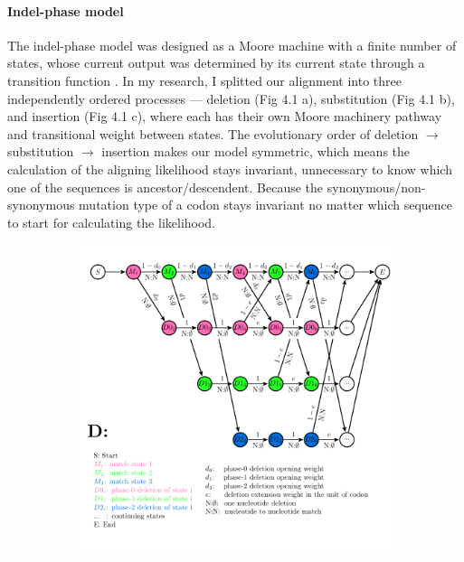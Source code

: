 \paragraph{Indel-phase model} The indel-phase model was designed as a Moore machine with a finite number of states, whose current output was determined by its current state through a transition function \parencite{giantamidis2021learning}. In my research, I splitted our alignment into three independently ordered processes --- deletion (Fig 4.1 a), substitution (Fig 4.1 b), and insertion (Fig 4.1 c), where each has their own Moore machinery pathway and transitional weight between states. The evolutionary order of  deletion $\rightarrow$ substitution $\rightarrow$ insertion makes our model symmetric, which means the calculation of the aligning likelihood stays invariant, unnecessary to know which one of the sequences is ancestor/descendent. Because the synonymous/non-synonymous mutation type of a codon stays invariant no matter which sequence to start for calculating the likelihood. 
\newpage
\begin{figure}[H]
    \centering
     \begin{minipage}[t]{1\textwidth}
     \begin{subfigure}{\textwidth}
      \includegraphics[width=\linewidth]{Fig1.1.pdf}
     \end{subfigure}
    \end{minipage}
\end{figure}
